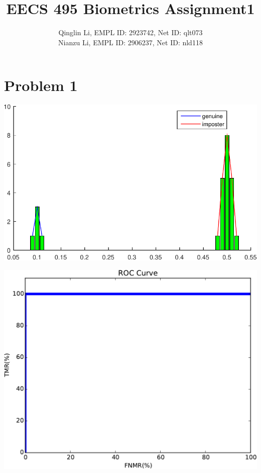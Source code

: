 \documentclass[12pt]{article}
\date{}
\title{EECS 495 Biometrics Assignment1}
\author{Qinglin Li, EMPL ID: 2923742, Net ID: qlt073\\ Nianzu Li, EMPL ID: 2906237, Net ID: nld118}
\begin{document}
\maketitle
\section*{Problem 1}
\includegraphics[scale=0.6]{distribution-crop}

\includegraphics[scale=0.5]{fig-p12-crop}
\end{document}
